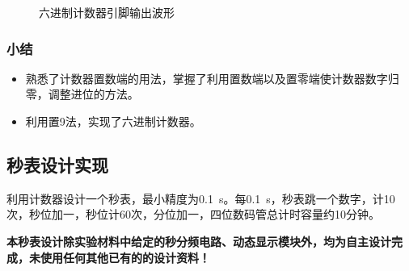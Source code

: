 \documentclass[UTF8]{ctexart}
\numberwithin{figure}{subsection}
\numberwithin{table}{subsection}
\numberwithin{equation}{subsection}
\begin{document}
\begin{figure}[H]
    \centering

    \caption{六进制计数器引脚输出波形}
    \label{6set9}
\end{figure}

\subsubsection{小结}
\begin{itemize}
    \item 熟悉了计数器置数端的用法，掌握了利用置数端以及置零端使计数器数字归零，调整进位的方法。
    \item 利用置9法，实现了六进制计数器。
\end{itemize}

\subsection{秒表设计实现}
利用计数器设计一个秒表，最小精度为\SI{0.1}{\second}。每\SI{0.1}{\second}，秒表跳一个数字，计10次，秒位加一，秒位计60次，分位加一，四位数码管总计时容量约10分钟。
\par {\color{red}\textbf{本秒表设计除实验材料中给定的秒分频电路、动态显示模块外，均为自主设计完成，未使用任何其他已有的的设计资料！}}
\end{document}

